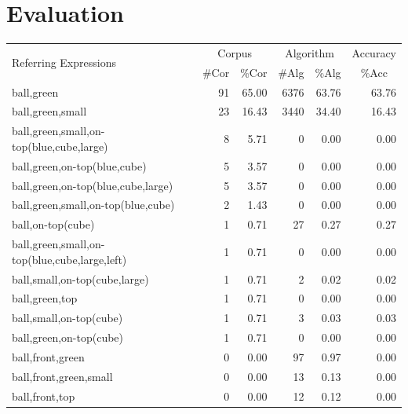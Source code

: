 \section{Evaluation}\label{sec:evaluation}

\begin{table}[!t]
\begin{small}
\begin{center}
\begin{tabular}{|l|r|r|r|r|r|}
\hline
\multirow{2}{*}{Referring Expressions} & \multicolumn{2}{|c|}{Corpus} & \multicolumn{2}{|c|}{Algorithm} & Accuracy \\ \cline{2-6} 
 & \#Cor & \multicolumn{1}{|c|}{\%Cor} & \multicolumn{1}{|c|}{\#Alg} & \multicolumn{1}{|c|}{\%Alg} & \multicolumn{1}{|c|}{\%Acc} \\
\hline
ball,green                                    & 91 & 65.00 & 6376 & 63.76 & 63.76 \\
ball,green,small                              & 23 & 16.43 & 3440 & 34.40 & 16.43 \\
ball,green,small,on-top(blue,cube,large)      &  8 &  5.71 &    0 &  0.00 &  0.00\\
ball,green,on-top(blue,cube)                  &  5 &  3.57 &    0 &  0.00 &  0.00\\
ball,green,on-top(blue,cube,large)            &  5 &  3.57 &    0 &  0.00 &  0.00\\
ball,green,small,on-top(blue,cube)            &  2 &  1.43 &    0 &  0.00 &  0.00\\
ball,on-top(cube)                             &  1 &  0.71 &   27 &  0.27 &  0.27 \\
ball,green,small,on-top(blue,cube,large,left) &  1 &  0.71 &    0 &  0.00 &  0.00\\
ball,small,on-top(cube,large)	              &  1 &  0.71 &    2 &  0.02 &  0.02 \\
ball,green,top                                &  1 &  0.71 &    0 &  0.00 &  0.00\\
ball,small,on-top(cube)                       &  1 &  0.71 &    3 &  0.03 &  0.03 \\
ball,green,on-top(cube)                       &  1 &  0.71 &    0 &  0.00 &  0.00\\
ball,front,green                              &  0 &  0.00 &   97 &  0.97 &  0.00\\
ball,front,green,small                        &  0 &  0.00 &   13 &  0.13 &  0.00\\
ball,front,top                                &  0 &  0.00 &   12 &  0.12 &  0.00\\

\end{tabular}
\end{center}
\end{small}
\end{table}
